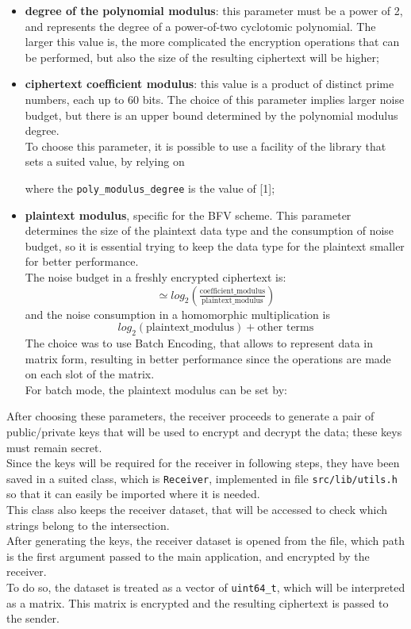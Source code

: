 \documentclass[10pt]{extarticle}
\begin{document}
\begin{itemize}
	\item \textbf{degree of the polynomial modulus}: this parameter must be a power of 2, and represents the degree of a power-of-two cyclotomic polynomial. The larger this value is, the more complicated the encryption operations that can be performed, but also the size of the resulting ciphertext will be higher;
	\item \textbf{ciphertext coefficient modulus}: this value is a product of distinct prime numbers, each up to 60 bits. The choice of this parameter implies larger noise budget, but there is an upper bound determined by the polynomial modulus degree.\\
	To choose this parameter, it is possible to use a facility of the library that sets a suited value, by relying on 
		
	where the \texttt{poly\_modulus\_degree} is the value of [1];
	\item \textbf{plaintext modulus}, specific for the BFV scheme. This parameter determines the size of the plaintext data type and the consumption of noise budget, so it is essential trying to keep the data type for the plaintext smaller for better performance.\\The noise budget in a freshly encrypted ciphertext is:
	\begin{equation}
		\simeq log_2(\tfrac{\text{coefficient\_modulus}}{\text{plaintext\_modulus}})
	\end{equation}
	and the noise consumption in a homomorphic multiplication is 
	\begin{equation}
		log_2(\text{plaintext\_modulus}) + \text{other terms}
	\end{equation}
	The choice was to use Batch Encoding, that allows to represent data in matrix form, resulting in better performance since the operations are made on each slot of the matrix.\\For batch mode, the plaintext modulus can be set by:
        
\end{itemize}
After choosing these parameters, the receiver proceeds to generate a pair of public/private keys that will be used to encrypt and decrypt the data; these keys must remain secret.\\
Since the keys will be required for the receiver in following steps, they have been saved in a suited class, which is \texttt{Receiver}, implemented in file \texttt{src/lib/utils.h} so that it can easily be imported where it is needed.\\This class also keeps the receiver dataset, that will be accessed to check which strings belong to the intersection.\\
After generating the keys, the receiver dataset is opened from the file, which path is the first argument passed to the main application, and encrypted by the receiver.\\To do so, the dataset is treated as a vector of \texttt{uint64\_t}, which will be interpreted as a matrix. This matrix is encrypted and the resulting ciphertext is passed to the sender.
\end{document}
